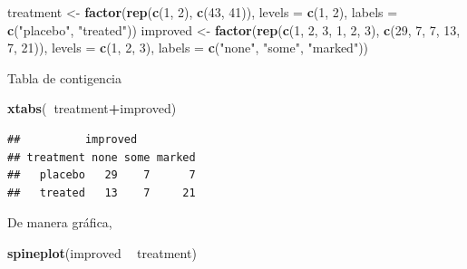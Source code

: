 \documentclass[]{book}
\newenvironment{Shaded}{\begin{snugshade}}{\end{snugshade}}
\newcommand{\KeywordTok}[1]{\textcolor[rgb]{0.13,0.29,0.53}{\textbf{#1}}}
\newcommand{\DataTypeTok}[1]{\textcolor[rgb]{0.13,0.29,0.53}{#1}}
\newcommand{\DecValTok}[1]{\textcolor[rgb]{0.00,0.00,0.81}{#1}}
\newcommand{\StringTok}[1]{\textcolor[rgb]{0.31,0.60,0.02}{#1}}
\newcommand{\OperatorTok}[1]{\textcolor[rgb]{0.81,0.36,0.00}{\textbf{#1}}}
\newcommand{\NormalTok}[1]{#1}
\begin{document}
\begin{Shaded}
\begin{Highlighting}[]
\NormalTok{treatment <-}\StringTok{ }\KeywordTok{factor}\NormalTok{(}\KeywordTok{rep}\NormalTok{(}\KeywordTok{c}\NormalTok{(}\DecValTok{1}\NormalTok{, }\DecValTok{2}\NormalTok{), }\KeywordTok{c}\NormalTok{(}\DecValTok{43}\NormalTok{, }\DecValTok{41}\NormalTok{)), }\DataTypeTok{levels =} \KeywordTok{c}\NormalTok{(}\DecValTok{1}\NormalTok{, }\DecValTok{2}\NormalTok{),}
                    \DataTypeTok{labels =} \KeywordTok{c}\NormalTok{(}\StringTok{"placebo"}\NormalTok{, }\StringTok{"treated"}\NormalTok{))}
\NormalTok{improved <-}\StringTok{ }\KeywordTok{factor}\NormalTok{(}\KeywordTok{rep}\NormalTok{(}\KeywordTok{c}\NormalTok{(}\DecValTok{1}\NormalTok{, }\DecValTok{2}\NormalTok{, }\DecValTok{3}\NormalTok{, }\DecValTok{1}\NormalTok{, }\DecValTok{2}\NormalTok{, }\DecValTok{3}\NormalTok{), }\KeywordTok{c}\NormalTok{(}\DecValTok{29}\NormalTok{, }\DecValTok{7}\NormalTok{, }\DecValTok{7}\NormalTok{, }\DecValTok{13}\NormalTok{, }\DecValTok{7}\NormalTok{, }\DecValTok{21}\NormalTok{)),}
                   \DataTypeTok{levels =} \KeywordTok{c}\NormalTok{(}\DecValTok{1}\NormalTok{, }\DecValTok{2}\NormalTok{, }\DecValTok{3}\NormalTok{),}
                   \DataTypeTok{labels =} \KeywordTok{c}\NormalTok{(}\StringTok{"none"}\NormalTok{, }\StringTok{"some"}\NormalTok{, }\StringTok{"marked"}\NormalTok{))}
\end{Highlighting}
\end{Shaded}

Tabla de contigencia

\begin{Shaded}
\begin{Highlighting}[]
\KeywordTok{xtabs}\NormalTok{(}\OperatorTok{~}\NormalTok{treatment}\OperatorTok{+}\NormalTok{improved)}
\end{Highlighting}
\end{Shaded}

\begin{verbatim}
##          improved
## treatment none some marked
##   placebo   29    7      7
##   treated   13    7     21
\end{verbatim}

De manera gráfica,

\begin{Shaded}
\begin{Highlighting}[]
\KeywordTok{spineplot}\NormalTok{(improved }\OperatorTok{~}\StringTok{ }\NormalTok{treatment)}
\end{Highlighting}
\end{Shaded}
\end{document}
